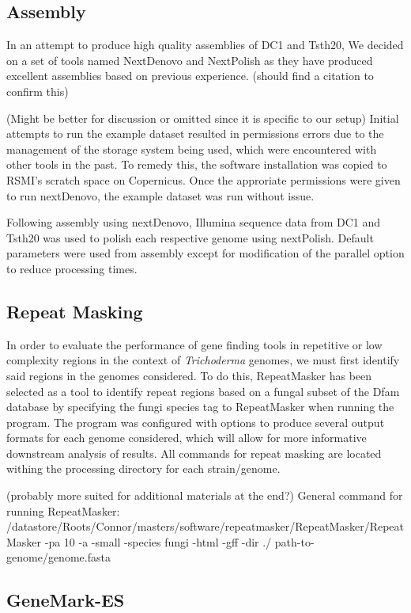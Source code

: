 \documentclass[12pt]{article}
\begin{document}
\subsection{Assembly}

In an attempt to produce high quality assemblies of DC1 and Tsth20, We
decided on a set of tools named NextDenovo and NextPolish as they have
produced excellent assemblies based on previous experience. (should
find a citation to confirm this)

(Might be better for discussion or omitted since it is specific to our
setup) Initial attempts to run the example dataset resulted in
permissions errors due to the management of the storage system being
used, which were encountered with other tools in the past. To remedy
this, the software installation was copied to RSMI's scratch space on
Copernicus. Once the approriate permissions were given to run
nextDenovo, the example dataset was run without issue.

Following assembly using nextDenovo, Illumina sequence data from DC1
and Tsth20 was used to polish each respective genome using
nextPolish. Default parameters were used from assembly except for
modification of the parallel option to reduce processing times.

\subsection{Repeat Masking}

In order to evaluate the performance of gene finding tools in
repetitive or low complexity regions in the context of
\textit{Trichoderma} genomes, we must first identify said regions in
the genomes considered. To do this, RepeatMasker has been selected as
a tool to identify repeat regions based on a fungal subset of the Dfam
database by specifying the fungi species tag to RepeatMasker when
running the program. The program was configured with options to
produce several output formats for each genome considered, which will
allow for more informative downstream analysis of results. All
commands for repeat masking are located withing the processing
directory for each strain/genome.

(probably more suited for additional materials at the end?)
General command for running RepeatMasker:
/datastore/Roots/Connor/masters/software/repeatmasker/RepeatMasker/RepeatMasker
-pa 10 -a -small -species fungi -html -gff -dir ./
path-to-genome/genome.fasta

\subsection{GeneMark-ES}
\end{document}
